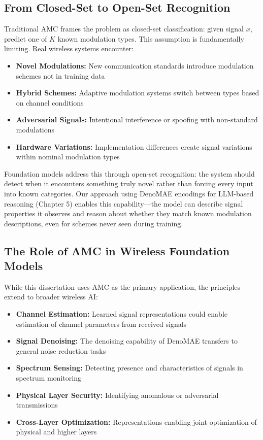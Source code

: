 \subsection{From Closed-Set to Open-Set Recognition}

Traditional AMC frames the problem as closed-set classification: given signal $x$, predict one of $K$ known modulation types. This assumption is fundamentally limiting. Real wireless systems encounter:

\begin{itemize}
    \item \textbf{Novel Modulations:} New communication standards introduce modulation schemes not in training data
    \item \textbf{Hybrid Schemes:} Adaptive modulation systems switch between types based on channel conditions
    \item \textbf{Adversarial Signals:} Intentional interference or spoofing with non-standard modulations
    \item \textbf{Hardware Variations:} Implementation differences create signal variations within nominal modulation types
\end{itemize}

Foundation models address this through open-set recognition: the system should detect when it encounters something truly novel rather than forcing every input into known categories. Our approach using DenoMAE encodings for LLM-based reasoning (Chapter 5) enables this capability—the model can describe signal properties it observes and reason about whether they match known modulation descriptions, even for schemes never seen during training.

\subsection{The Role of AMC in Wireless Foundation Models}

While this dissertation uses AMC as the primary application, the principles extend to broader wireless AI:

\begin{itemize}
    \item \textbf{Channel Estimation:} Learned signal representations could enable estimation of channel parameters from received signals
    \item \textbf{Signal Denoising:} The denoising capability of DenoMAE transfers to general noise reduction tasks
    \item \textbf{Spectrum Sensing:} Detecting presence and characteristics of signals in spectrum monitoring
    \item \textbf{Physical Layer Security:} Identifying anomalous or adversarial transmissions
    \item \textbf{Cross-Layer Optimization:} Representations enabling joint optimization of physical and higher layers
\end{itemize}

